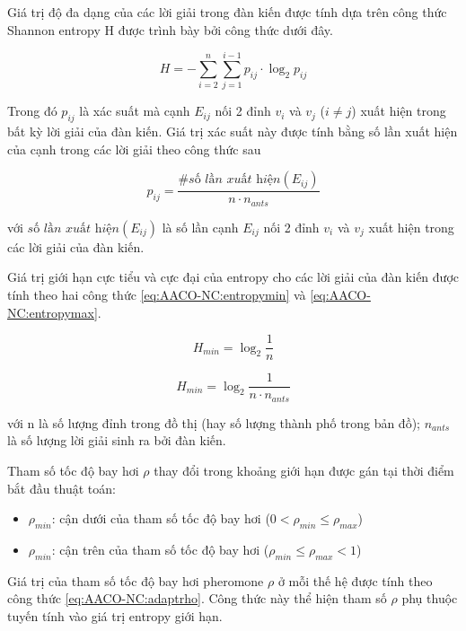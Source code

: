 Giá trị độ đa dạng của các lời giải trong đàn kiến được tính dựa trên công thức Shannon entropy H được trình bày bởi công thức dưới đây.

\begin{equation}\label{eq:AACO-NC:entropy}
    H = -\sum_{i=2}^{n}\sum_{j=1}^{i-1}p_{ij} \cdot \log_2 p_{ij}
\end{equation}

Trong đó $p_{ij}$ là xác suất mà cạnh $E_{ij}$ nối 2 đỉnh $v_i$ và $v_j$ ($i \neq j$) xuất hiện trong bất kỳ lời giải của đàn kiến. Giá trị xác suất này được tính bằng số lần xuất hiện của cạnh trong các lời giải theo công thức sau

\begin{equation}\label{eq:AACO-NC:entropy_prob}
    p_{ij} = \frac{\textit{\# số lần xuất hiện}(E_{ij})}{n \cdot n_{ants}}
\end{equation}

với $\textit{số lần xuất hiện}(E_{ij})$ là số lần cạnh $E_{ij}$ nối 2 đỉnh $v_i$ và $v_j$ xuất hiện trong các lời giải của đàn kiến.

Giá trị giới hạn cực tiểu và cực đại của entropy cho các lời giải của đàn kiến  được tính theo hai công thức \ref{eq:AACO-NC:entropymin} và \ref{eq:AACO-NC:entropymax}.

\begin{equation}\label{eq:AACO-NC:entropymin}
    H_{min} = \log_2 \frac{1}{n}
\end{equation}

\begin{equation}\label{eq:AACO-NC:entropymax}
    H_{min} = \log_2 \frac{1}{n\cdot n_{ants}}
\end{equation}

với n là số lượng đỉnh trong đồ thị (hay số lượng thành phố trong bản đồ); $n_{ants}$ là số lượng lời giải sinh ra bởi đàn kiến.

Tham số tốc độ bay hơi $\rho$ thay đổi trong khoảng giới hạn được gán tại thời điểm bắt đầu thuật toán:
\begin{itemize}
    \item $\rho_{min}$: cận dưới của tham số tốc độ bay hơi ($0 < \rho_{min} \leq \rho_{max}$)
    \item $\rho_{min}$: cận trên của tham số tốc độ bay hơi ($\rho_{min} \leq \rho_{max} < 1$)
\end{itemize}

Giá trị của tham số tốc độ bay hơi pheromone $\rho$ ở mỗi thế hệ được tính theo công thức \ref{eq:AACO-NC:adaptrho}. Công thức này thể hiện tham số $\rho$ phụ thuộc tuyến tính vào giá trị entropy giới hạn.

